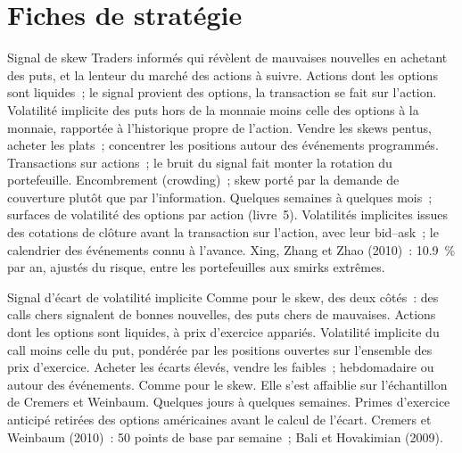 \section{Fiches de stratégie}

\begin{strategyfile}{Signal de skew}\label{strat:s1:options-implied-signals-for-stocks:skew}
 Traders informés qui révèlent de mauvaises nouvelles en achetant des puts, et la lenteur du marché des actions à suivre.
 Actions dont les options sont liquides~; le signal provient des options, la transaction se fait sur l'action.
 Volatilité implicite des puts hors de la monnaie moins celle des options à la monnaie, rapportée à l'historique propre de l'action.
 Vendre les skews pentus, acheter les plats~; concentrer les positions autour des événements programmés.
 Transactions sur actions~; le bruit du signal fait monter la rotation du portefeuille.
 Encombrement (crowding)~; skew porté par la demande de couverture plutôt que par l'information.
 Quelques semaines à quelques mois~; surfaces de volatilité des options par action (livre~5).
 Volatilités implicites issues des cotations de clôture avant la transaction sur l'action, avec leur bid--ask~; le calendrier des événements connu à l'avance.
 Xing, Zhang et Zhao (2010)~: 10.9~\% par an, ajustés du risque, entre les portefeuilles aux smirks extrêmes.
\end{strategyfile}

\begin{strategyfile}{Signal d'écart de volatilité implicite}\label{strat:s1:options-implied-signals-for-stocks:spread}
 Comme pour le skew, des deux côtés~: des calls chers signalent de bonnes nouvelles, des puts chers de mauvaises.
 Actions dont les options sont liquides, à prix d'exercice appariés.
 Volatilité implicite du call moins celle du put, pondérée par les positions ouvertes sur l'ensemble des prix d'exercice.
 Acheter les écarts élevés, vendre les faibles~; hebdomadaire ou autour des événements.
 Comme pour le skew.
 Elle s'est affaiblie sur l'échantillon de Cremers et Weinbaum.
 Quelques jours à quelques semaines.
 Primes d'exercice anticipé retirées des options américaines avant le calcul de l'écart.
 Cremers et Weinbaum (2010)~: 50 points de base par semaine~; Bali et Hovakimian (2009).
\end{strategyfile}

